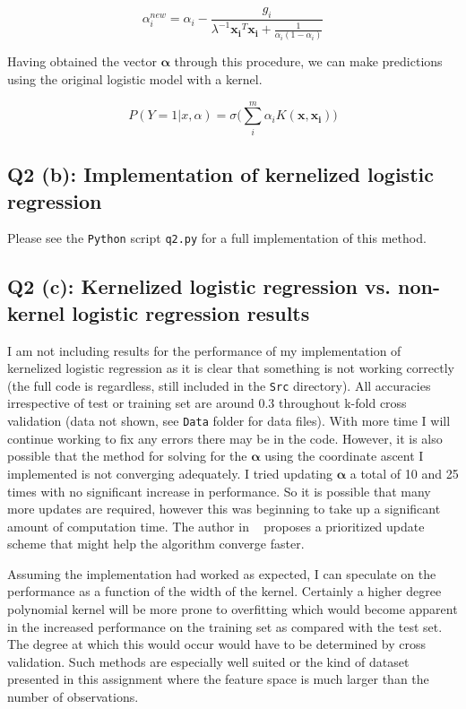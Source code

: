 \documentclass[11pt]{amsart}
\newcommand{\vek}[1]{\mathbf{#1}}
\begin{document}
\begin{equation}
\alpha_i^{new} = \alpha_i - \frac{g_i}{\lambda^{-1}\vek{x_i}^T\vek{x_i} + \frac{1}{\alpha_i(1-\alpha_i)}}
\end{equation}

Having obtained the vector $\vek{\alpha}$ through this procedure, we can make predictions using the original logistic model with a kernel.

\begin{equation}
P(Y=1 \vert x, \alpha) = \sigma\bigg(\sum_i^{m} \alpha_i K(\vek{x}, \vek{x_i})\bigg)
\end{equation}


\subsection{Q2 (b): Implementation of kernelized logistic regression}

Please see the \texttt{Python} script \texttt{q2.py} for a full implementation of this method.

\subsection{Q2 (c): Kernelized logistic regression vs. non-kernel logistic regression results}

I am not including results for the performance of my implementation of kernelized logistic regression as it is clear that something is not working correctly (the full code is regardless, still included in the \texttt{Src} directory). All accuracies irrespective of test or training set are around $0.3$ throughout k-fold cross validation (data not shown, see \texttt{Data} folder for data files). With more time I will continue working to fix any errors there may be in the code. However, it is also possible that the method for solving for the $\vek{\alpha}$ using the coordinate ascent I implemented is not converging adequately. I tried updating $\vek{\alpha}$ a total of 10 and 25 times with no significant increase in performance. So it is possible that many more updates are required, however this was beginning to take up a significant amount of computation time. The author in ~\cite{minka2003comparison} proposes a prioritized update scheme that might help the algorithm converge faster. 

Assuming the implementation had worked as expected, I can speculate on the performance as a function of the width of the kernel. Certainly a higher degree polynomial kernel will be more prone to overfitting which would become apparent in the increased performance on the training set as compared with the test set. The degree at which this would occur would have to be determined by cross validation. Such methods are especially well suited or the kind of dataset presented in this assignment where the feature space is much larger than the number of observations.
\end{document}
